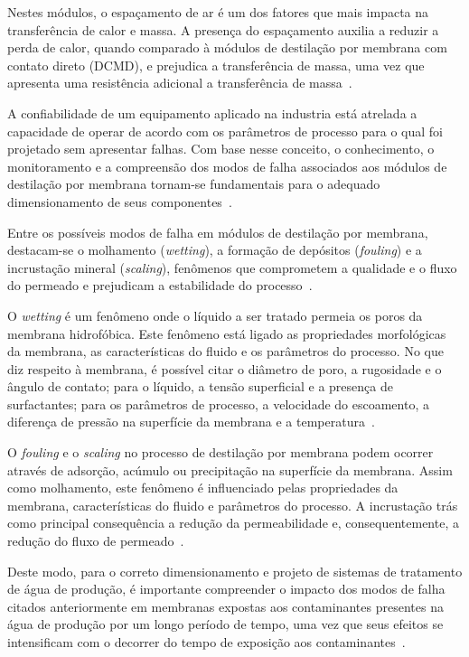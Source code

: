Nestes módulos, o espaçamento de ar é um dos fatores que mais impacta na transferência de calor e massa. A presença do espaçamento auxilia a reduzir a perda de calor, quando comparado à módulos de destilação por membrana com contato direto (DCMD), e prejudica a transferência de massa, uma vez que apresenta uma resistência adicional a transferência de massa~\cite{Olatunji2018MDModeling,Yan2021MDWastewater,Kaur2023MDOverview,Adewole2022MDDesalination}. 

A confiabilidade de um equipamento aplicado na industria está atrelada a capacidade de operar de acordo com os parâmetros de processo para o qual foi projetado sem apresentar falhas. Com base nesse conceito, o conhecimento, o monitoramento e a compreensão dos modos de falha associados aos módulos de destilação por membrana tornam-se fundamentais para o adequado dimensionamento de seus componentes~\cite{smith2011}.

Entre os possíveis modos de falha em módulos de destilação por membrana, destacam-se o molhamento (\textit{wetting}), a formação de depósitos (\textit{fouling}) e a incrustação mineral (\textit{scaling}), fenômenos que comprometem a qualidade e o fluxo do permeado e prejudicam a estabilidade do processo~\cite{Alkhatib2021FoulingMD,Yao2020WettabilityMD,Yan2021}. 

O \textit{wetting} é um fenômeno onde o líquido a ser tratado permeia os poros da membrana hidrofóbica. Este fenômeno está ligado as propriedades morfológicas da membrana, as características do fluido e os parâmetros do processo. No que diz respeito à membrana, é possível citar o diâmetro de poro, a rugosidade e o ângulo de contato; para o líquido, a tensão superficial e a presença de surfactantes; para os parâmetros de processo, a velocidade do escoamento, a diferença de pressão na superfície da membrana e a temperatura~\cite{Yao2020WettabilityMD}.

O \textit{fouling} e o \textit{scaling} no processo de destilação por membrana podem ocorrer através de adsorção, acúmulo ou precipitação na superfície da membrana. Assim como molhamento, este fenômeno é influenciado pelas propriedades da membrana, características do fluido e parâmetros do processo. A incrustação trás como principal consequência a redução da permeabilidade e, consequentemente, a redução do fluxo de permeado~\cite{Alkhatib2021FoulingMD}.

Deste modo, para o correto dimensionamento e projeto de sistemas de tratamento de água de produção, é importante compreender o impacto dos modos de falha citados anteriormente em membranas expostas aos contaminantes presentes na água de produção por um longo período de tempo, uma vez que seus efeitos se intensificam com o decorrer do tempo de exposição aos contaminantes~\cite{Tomczak2021OilSurfactants}.

